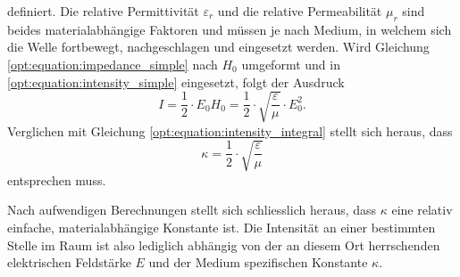 definiert.
Die relative Permittivität $\varepsilon_r$ und die relative Permeabilität $\mu_r$ sind beides materialabhängige Faktoren und müssen je nach Medium, in welchem sich die Welle fortbewegt, nachgeschlagen und eingesetzt werden.
Wird Gleichung \eqref{opt:equation:impedance_simple} nach $H_0$ umgeformt und in \eqref{opt:equation:intensity_simple} eingesetzt, folgt der Ausdruck
\begin{equation*}
I
=
\frac{1}{2} \cdot E_0 H_0
=
\frac{1}{2} \cdot \sqrt{\frac{\varepsilon}{\mu}} \cdot E_0^2
.
\end{equation*}
Verglichen mit Gleichung \eqref{opt:equation:intensity_integral} stellt sich heraus, dass
\begin{equation*}
\kappa
=
\frac{1}{2} \cdot \sqrt{\frac{\varepsilon}{\mu}}
\end{equation*}
entsprechen muss.

Nach aufwendigen Berechnungen stellt sich schliesslich heraus, dass $\kappa$ eine relativ einfache, materialabhängige Konstante ist.
Die Intensität an einer bestimmten Stelle im Raum ist also lediglich abhängig von der an diesem Ort herrschenden elektrischen Feldstärke $E$ und der Medium spezifischen Konstante $\kappa$.


